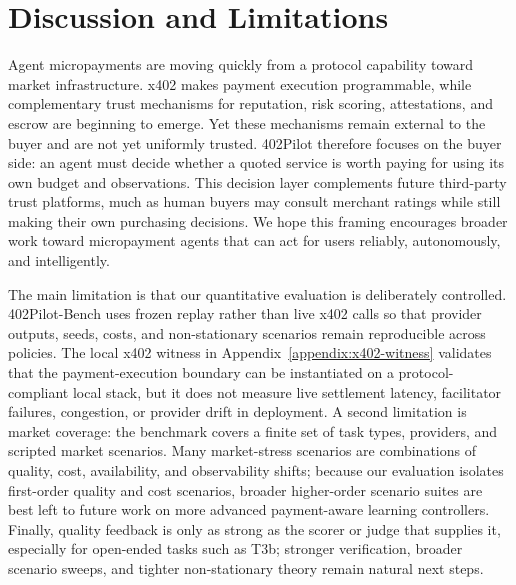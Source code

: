 \section{Discussion and Limitations}
\label{sec:discuss}

Agent micropayments are moving quickly from a protocol capability toward market infrastructure. x402 makes payment execution programmable, while complementary trust mechanisms for reputation, risk scoring, attestations, and escrow are beginning to emerge. Yet these mechanisms remain external to the buyer and are not yet uniformly trusted. 402Pilot therefore focuses on the buyer side: an agent must decide whether a quoted service is worth paying for using its own budget and observations. This decision layer complements future third-party trust platforms, much as human buyers may consult merchant ratings while still making their own purchasing decisions. We hope this framing encourages broader work toward micropayment agents that can act for users reliably, autonomously, and intelligently.

The main limitation is that our quantitative evaluation is deliberately controlled. 402Pilot-Bench uses frozen replay rather than live x402 calls so that provider outputs, seeds, costs, and non-stationary scenarios remain reproducible across policies. The local x402 witness in Appendix~\ref{appendix:x402-witness} validates that the payment-execution boundary can be instantiated on a protocol-compliant local stack, but it does not measure live settlement latency, facilitator failures, congestion, or provider drift in deployment. A second limitation is market coverage: the benchmark covers a finite set of task types, providers, and scripted market scenarios. Many market-stress scenarios are combinations of quality, cost, availability, and observability shifts; because our evaluation isolates first-order quality and cost scenarios, broader higher-order scenario suites are best left to future work on more advanced payment-aware learning controllers. Finally, quality feedback is only as strong as the scorer or judge that supplies it, especially for open-ended tasks such as T3b; stronger verification, broader scenario sweeps, and tighter non-stationary theory remain natural next steps.
